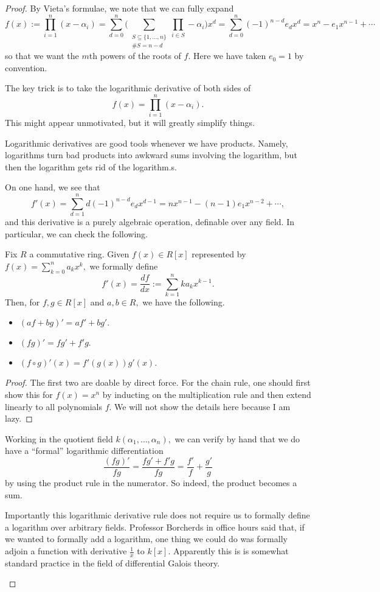 \begin{proof}
	By Vieta's formulae, we note that we can fully expand
	\[f(x):=\prod_{i=1}^n(x-\alpha_i)=\sum_{d=0}^n\bigg(\sum_{\substack{S\subseteq\{1,\ldots,n\}\\\#S=n-d}}\prod_{i\in S}-\alpha_i\bigg)x^d=\sum_{d=0}^n(-1)^{n-d}e_dx^d=x^n-e_1x^{n-1}+\cdots\]
	so that we want the $m$th powers of the roots of $f.$ Here we have taken $e_0=1$ by convention.
	
	The key trick is to take the logarithmic derivative of both sides of
	\[f(x)=\prod_{i=1}^n(x-\alpha_i).\]
	This might appear unmotivated, but it will greatly simplify things.
	\begin{remark}
		Logarithmic derivatives are good tools whenever we have products. Namely, logarithms turn bad products into awkward sums involving the logarithm, but then the logarithm gets rid of the logarithm.s.
	\end{remark}
	On one hand, we see that
	\[f'(x)=\sum_{d=1}^nd(-1)^{n-d}e_dx^{d-1}=nx^{n-1}-(n-1)e_1x^{n-2}+\cdots,\]
	and this derivative is a purely algebraic operation, definable over any field. In particular, we can check the following.
	\begin{proposition}
		Fix $R$ a commutative ring. Given $f(x)\in R[x]$ represented by $f(x)=\sum_{k=0}^na_kx^k,$ we formally define
		\[f'(x)=\frac{df}{dx}:=\sum_{k=1}^nka_kx^{k-1}.\]
		Then, for $f,g\in R[x]$ and $a,b\in R,$ we have the following.
		\begin{itemize}
			\item $(af+bg)'=af'+bg'.$
			\item $(fg)'=fg'+f'g.$
			\item $(f\circ g)'(x)=f'(g(x))g'(x).$
		\end{itemize}
	\end{proposition}
	\begin{proof}
		The first two are doable by direct force. For the chain rule, one should first show this for $f(x)=x^n$ by inducting on the multiplication rule and then extend linearly to all polynomials $f.$ We will not show the details here because I am lazy.
	\end{proof}
	Working in the quotient field $k(\alpha_1,\ldots,\alpha_n),$ we can verify by hand that we do have a ``formal'' logarithmic differentiation
	\[\frac{(fg)'}{fg}=\frac{fg'+f'g}{fg}=\frac{f'}f+\frac{g'}g\]
	by using the product rule in the numerator. So indeed, the product becomes a sum.
	\begin{remark}
		Importantly this logarithmic derivative rule does not require us to formally define a logarithm over arbitrary fields. Professor Borcherds in office hours said that, if we wanted to formally add a logarithm, one thing we could do was formally adjoin a function with derivative $\frac1x$ to $k[x].$ Apparently this is is somewhat standard practice in the field of differential Galois theory.

\end{remark}
\end{proof}
